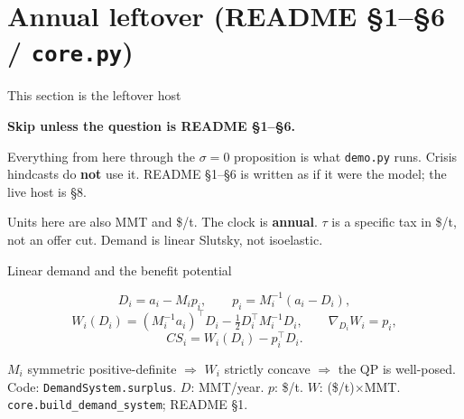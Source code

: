 \section{Annual leftover (README \S1--\S6 / \texttt{core.py})}

\begin{frame}[label=leftover]{This section is the leftover host}

\textbf{Skip unless the question is README \S1--\S6.}
\hyperlink{questions}{}

Everything from here through the $\sigma=0$ proposition is what
\texttt{demo.py} runs. Crisis hindcasts do \textbf{not} use it. README
\S1--\S6 is written as if it were the model; the live host is \S8.

Units here are also MMT and \$/t. The clock is \textbf{annual}. $\tau$ is
a specific tax in \$/t, not an offer cut. Demand is linear Slutsky, not
isoelastic.
\end{frame}

\begin{frame}{Linear demand and the benefit potential}

\[
D_i = a_i - M_i p_i,
\qquad
p_i = M_i^{-1}(a_i - D_i),
\]
\[
W_i(D_i) = (M_i^{-1}a_i)^\top D_i - \tfrac12 D_i^\top M_i^{-1} D_i,
\qquad
\nabla_{D_i} W_i = p_i,
\]
\[
CS_i = W_i(D_i) - p_i^\top D_i.
\]

$M_i$ symmetric positive-definite $\Rightarrow$ $W_i$ strictly concave
$\Rightarrow$ the QP is well-posed. Code: \texttt{DemandSystem.surplus}.
{$D$: MMT/year. $p$: \$/t. $W$: (\$/t)$\times$MMT.}
{\texttt{core.build\_demand\_system}; README \S1.}
\end{frame}

